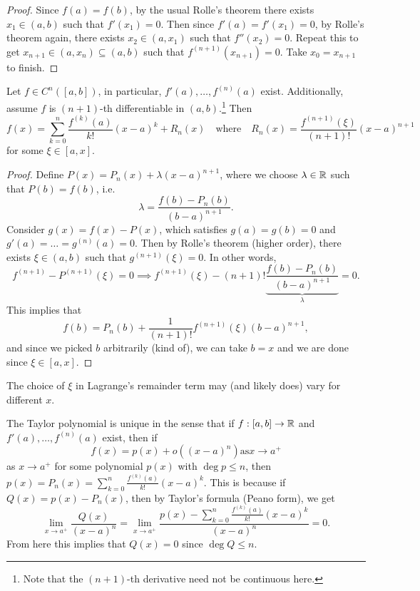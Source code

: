 \begin{proof}
  Since $f(a) = f(b)$, by the usual Rolle's theorem
  there exists $x_1 \in (a, b)$ such that $f'(x_1) = 0$.
  Then since $f'(a) = f'(x_1) = 0$, by
  Rolle's theorem again,
  there exists $x_2 \in (a, x_1)$ such that $f''(x_2) = 0$.
  Repeat this to get $x_{n + 1} \in (a, x_n) \subseteq (a, b)$ such that
  $f^{(n + 1)}(x_{n + 1}) = 0$. Take $x_0 = x_{n + 1}$
  to finish.
\end{proof}

\begin{theorem}
  Let $f \in C^n([a, b])$, in particular,
  $f'(a), \dots, f^{(n)}(a)$ exist. Additionally,
  assume $f$ is $(n + 1)$-th differentiable in $(a, b)$.\footnote{Note that the $(n + 1)$-th derivative need not be continuous here.}
  Then
  \[
    f(x) = \sum_{k = 0}^n \frac{f^{(k)}(a)}{k!}(x - a)^k + R_n(x) \quad \text{where} \quad R_n(x) = \frac{f^{(n + 1)}(\xi)}{(n + 1)!}(x - a)^{n + 1}
  \]
  for some $\xi \in [a, x]$.
\end{theorem}

\begin{proof}
  Define $P(x) = P_n(x) + \lambda (x - a)^{n + 1}$, where
  we choose $\lambda \in \mathbb{R}$ such that $P(b) = f(b)$, i.e.
  \[
    \lambda = \frac{f(b) - P_n(b)}{(b - a)^{n + 1}}.
  \]
  Consider $g(x)  = f(x) - P(x)$, which satisfies
  $g(a) = g(b) = 0$ and $g'(a) = \dots = g^{(n)}(a) = 0$.
  Then by Rolle's theorem (higher order), there exists
  $\xi \in (a, b)$ such that $g^{(n + 1)}(\xi) = 0$.
  In other words,
  \[
    f^{(n + 1)} - P^{(n + 1)}(\xi) = 0
    \implies f^{(n + 1)}(\xi) - (n + 1)! \underbrace{\frac{f(b) - P_n(b)}{(b - a)^{n + 1}}}_{\lambda} = 0.
  \]
  This implies that
  \[
    f(b) = P_n(b) + \frac{1}{(n + 1)!} f^{(n + 1)}(\xi) (b - a)^{n + 1},
  \]
  and since we picked $b$ arbitrarily (kind of),
  we can take $b = x$ and we are done since
  $\xi \in [a, x]$.
\end{proof}

\begin{remark}
  The choice of $\xi$ in Lagrange's remainder term
  may (and likely does) vary for different $x$.
\end{remark}

\begin{remark}
  The Taylor polynomial is unique in the sense that
  if $f : [a, b] \to \mathbb{R}$ and $f'(a), \dots, f^{(n)}(a)$
  exist, then if
  \[f(x) = p(x) + o((x - a)^n) \text{as} x \to a^+\]
  as $x \to a^+$ for some polynomial $p(x)$ with
  $\deg p \le n$, then
  $p(x) = P_n(x) = \sum_{k = 0}^n \frac{f^{(k)}(a)}{k!} (x - a)^k$.
  This is because if $Q(x) = p(x) - P_n(x)$, then
  by Taylor's formula (Peano form), we get
  \[
    \lim_{x \to a^+} \frac{Q(x)}{(x - a)^n}
    = \lim_{x \to a^+} \frac{p(x) - \sum_{k = 0}^n \frac{f^{(k)}(a)}{k!} (x - a)^k}{(x - a)^n} = 0.
  \]
  From here this implies that $Q(x) = 0$ since $\deg Q \le n$.
\end{remark}
